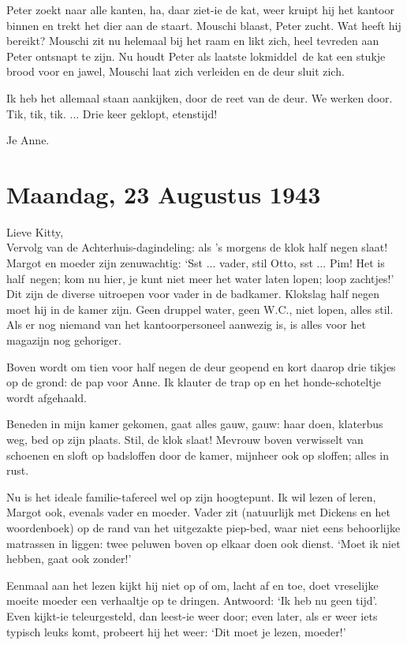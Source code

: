 \documentclass{book}
\begin{document}
Peter zoekt naar alle kanten, ha, daar ziet-ie de kat, weer kruipt hij
het kantoor binnen en trekt het dier aan de staart. Mouschi blaast,
Peter zucht. Wat heeft hij bereikt? Mouschi zit nu helemaal bij het raam
en likt zich, heel tevreden aan Peter ontsnapt te zijn. Nu houdt Peter
als laatste lokmiddel~de kat een stukje brood voor en jawel, Mouschi
laat zich verleiden en de deur sluit zich.

Ik heb het allemaal staan aankijken, door de reet van de deur. We werken
door. Tik, tik, tik. ... Drie keer geklopt, etenstijd!

Je Anne.

\chapter{Maandag, 23 Augustus 1943}

Lieve Kitty,\\Vervolg van de Achterhuis-dagindeling: als 's morgens de
klok half negen slaat! Margot en moeder zijn zenuwachtig: `Sst ...
vader, stil Otto, sst ... Pim! Het is half~negen; kom nu hier, je kunt
niet meer het water laten lopen; loop zachtjes!' Dit zijn de diverse
uitroepen voor vader in de badkamer. Klokslag half negen moet hij in de
kamer zijn. Geen druppel water, geen W.C., niet lopen, alles stil. Als
er nog niemand van het kantoorpersoneel aanwezig is, is alles voor het
magazijn nog gehoriger.

Boven wordt om tien voor half negen de deur geopend en kort daarop drie
tikjes op de grond: de pap voor Anne. Ik klauter de trap op en het
honde-schoteltje wordt afgehaald.

Beneden in mijn kamer gekomen, gaat alles gauw, gauw: haar doen,
klaterbus weg, bed op zijn plaats. Stil, de klok slaat! Mevrouw boven
verwisselt van schoenen en sloft op badsloffen door de kamer, mijnheer
ook op sloffen; alles in rust.

Nu is het ideale familie-tafereel wel op zijn hoogtepunt. Ik wil lezen
of leren, Margot ook, evenals vader en moeder. Vader zit (natuurlijk met
Dickens en het woordenboek) op de rand van het uitgezakte piep-bed, waar
niet eens behoorlijke matrassen in liggen: twee peluwen boven op elkaar
doen ook dienst. `Moet ik niet hebben, gaat ook zonder!'

Eenmaal aan het lezen kijkt hij niet op of om, lacht af en toe, doet
vreselijke moeite moeder een verhaaltje op te dringen. Antwoord: `Ik heb
nu geen tijd'. Even kijkt-ie teleurgesteld, dan leest-ie weer door; even
later, als er weer iets typisch leuks komt, probeert hij het weer: `Dit
moet je lezen, moeder!'
\end{document}
